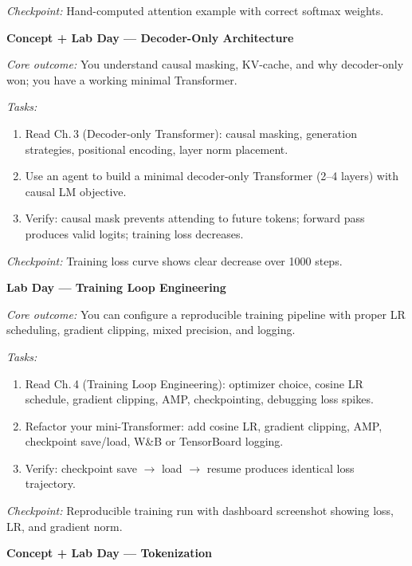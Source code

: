 \begin{description}[style=nextline, leftmargin=1.8cm, labelwidth=1.5cm]
\textit{Checkpoint:} Hand-computed attention example with correct softmax weights.

\item[Day 5] \textbf{Concept + Lab Day --- Decoder-Only Architecture}

\textit{Core outcome:} You understand causal masking, KV-cache, and why decoder-only won; you have a working minimal Transformer.

\textit{Tasks:}
\begin{enumerate}
    \item Read Ch.\,3 (Decoder-only Transformer): causal masking, generation strategies, positional encoding, layer norm placement.
    \item Use an agent to build a minimal decoder-only Transformer (2--4 layers) with causal LM objective.
    \item Verify: causal mask prevents attending to future tokens; forward pass produces valid logits; training loss decreases.
\end{enumerate}

\textit{Checkpoint:} Training loss curve shows clear decrease over 1000 steps.

\item[Day 6] \textbf{Lab Day --- Training Loop Engineering}

\textit{Core outcome:} You can configure a reproducible training pipeline with proper LR scheduling, gradient clipping, mixed precision, and logging.

\textit{Tasks:}
\begin{enumerate}
    \item Read Ch.\,4 (Training Loop Engineering): optimizer choice, cosine LR schedule, gradient clipping, AMP, checkpointing, debugging loss spikes.
    \item Refactor your mini-Transformer: add cosine LR, gradient clipping, AMP, checkpoint save/load, W\&B or TensorBoard logging.
    \item Verify: checkpoint save $\rightarrow$ load $\rightarrow$ resume produces identical loss trajectory.
\end{enumerate}

\textit{Checkpoint:} Reproducible training run with dashboard screenshot showing loss, LR, and gradient norm.


\item[Day 7] \textbf{Concept + Lab Day --- Tokenization}


\end{description}
